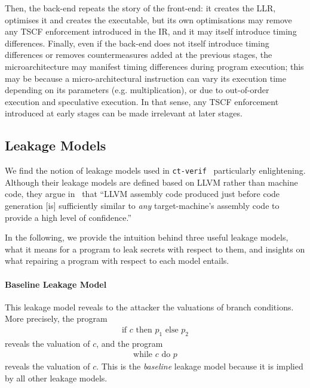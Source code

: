 Then, the back-end repeats the story of the front-end: it creates the LLR, optimises it and creates the executable, but its own optimisations may remove any TSCF enforcement introduced in the IR, and it may itself introduce timing differences. 
Finally, even if the back-end does not itself introduce timing differences or removes countermeasures added at the previous stages, the microarchitecture may manifest timing differences during program execution; this may be because a micro-architectural instruction can vary its execution time depending on its parameters (e.g. multiplication), or due to out-of-order execution and speculative execution. In that sense, any TSCF enforcement introduced at early stages can be made irrelevant at later stages.  

\subsection{Leakage Models}
We find the notion of leakage models used in \texttt{ct-verif}~\cite{usenix_ctp_verification} particularly enlightening. Although their leakage models are defined based on LLVM rather than machine code, %
they argue in~\cite[\S5]{usenix_ctp_verification} that ``LLVM
assembly code produced just before code generation [is] sufficiently
similar to \emph{any} target-machine's assembly code to
provide a high level of confidence.'' 

In the following, we provide the intuition behind three useful leakage models, what it means for a program to leak secrets with respect to them, and insights on what repairing a program with respect to each model entails.

\paragraph*{Baseline Leakage Model} This leakage model reveals to the attacker the valuations of branch conditions. More precisely, the program 
\begin{align*}
    \text{if $c$ then $p_1$ else $p_2$}
\end{align*}
reveals the valuation of $c$, and the program
\begin{align*}
    \text{while $c$ do $p$}
\end{align*}
reveals the valuation of $c$. This is the \emph{baseline} leakage model because it is implied by all other leakage models.

